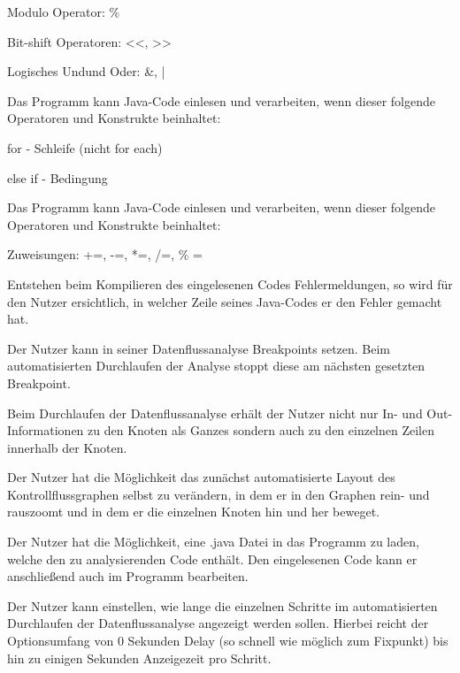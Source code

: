 Modulo Operator: \%

Bit-shift Operatoren: <<, >>

Logisches \glqq Und\grqq und \glqq Oder\grqq : \&, |

Das Programm kann Java-Code einlesen und verarbeiten, wenn dieser folgende Operatoren und Konstrukte beinhaltet:

for - Schleife (nicht for each)

else if - Bedingung

Das Programm kann Java-Code einlesen und verarbeiten, wenn dieser folgende Operatoren und Konstrukte beinhaltet:

Zuweisungen: +=, -=, *=, /=, \% =

Entstehen beim Kompilieren des eingelesenen Codes Fehlermeldungen, so wird für den Nutzer ersichtlich, in welcher Zeile seines Java-Codes er den Fehler gemacht hat.

Der Nutzer kann in seiner Datenflussanalyse Breakpoints setzen. Beim automatisierten Durchlaufen der Analyse stoppt diese am nächsten gesetzten Breakpoint.

Beim Durchlaufen der Datenflussanalyse erhält der Nutzer nicht nur In- und Out-
Informationen zu den Knoten als Ganzes sondern auch zu den einzelnen Zeilen
innerhalb der Knoten.

Der Nutzer hat die Möglichkeit das zunächst automatisierte Layout des
Kontrollflussgraphen selbst zu verändern, in dem er in den Graphen rein- und
rauszoomt und in dem er die einzelnen Knoten hin und her beweget.

Der Nutzer hat die Möglichkeit, eine .java Datei in das Programm zu laden, welche
den zu analysierenden Code enthält. Den eingelesenen Code kann er anschließend
auch im Programm bearbeiten.

Der Nutzer kann einstellen, wie lange die einzelnen Schritte im automatisierten
Durchlaufen der Datenflussanalyse angezeigt werden sollen. Hierbei reicht der
Optionsumfang von 0 Sekunden Delay (so schnell wie möglich zum Fixpunkt) bis hin
zu einigen Sekunden Anzeigezeit pro Schritt.

